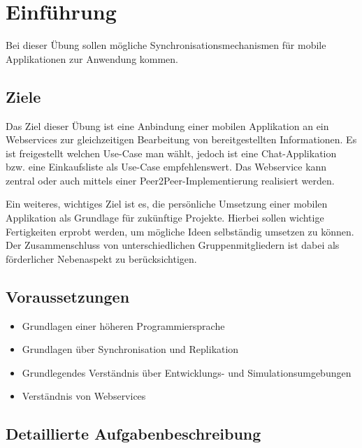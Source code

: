 
\section{Einführung}

Bei dieser Übung sollen mögliche Synchronisationsmechanismen für mobile Applikationen zur Anwendung kommen.\cite{syt-exercises:mobile-application}

\subsection{Ziele}
Das Ziel dieser Übung ist eine Anbindung einer mobilen Applikation an ein Webservices zur gleichzeitigen Bearbeitung von bereitgestellten Informationen. Es ist freigestellt welchen Use-Case man wählt, jedoch ist eine Chat-Applikation bzw. eine Einkaufsliste als Use-Case empfehlenswert. Das Webservice kann zentral oder auch mittels einer Peer2Peer-Implementierung realisiert werden.\cite{syt-exercises:mobile-application}

Ein weiteres, wichtiges Ziel ist es, die persönliche Umsetzung einer mobilen Applikation als Grundlage für zukünftige Projekte. Hierbei sollen wichtige Fertigkeiten erprobt werden, um mögliche Ideen selbständig umsetzen zu können. Der Zusammenschluss von unterschiedlichen Gruppenmitgliedern ist dabei als förderlicher Nebenaspekt zu berücksichtigen.\cite{syt-exercises:mobile-application}

\subsection{Voraussetzungen}

\begin{itemize}
    \item Grundlagen einer höheren Programmiersprache
    \item Grundlagen über Synchronisation und Replikation
    \item Grundlegendes Verständnis über Entwicklungs- und Simulationsumgebungen
    \item Verständnis von Webservices
\end{itemize}\cite{syt-exercises:mobile-application}

\subsection{Detaillierte Aufgabenbeschreibung}

